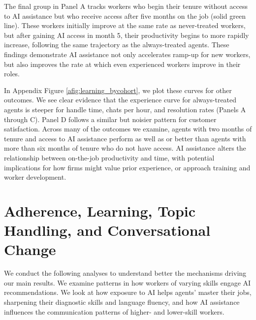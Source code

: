 \documentclass[11pt]{article}
\begin{document}
The final group in Panel A tracks workers who begin their tenure without access to AI assistance but who receive access after five months on the job (solid green line).  These workers initially improve at the same rate as never-treated workers, but after gaining AI access in month 5, their productivity begins to more rapidly increase, following the same trajectory as the always-treated agents. These findings demonstrate AI assistance not only accelerates ramp-up for new workers, but also improves the rate at which even experienced workers improve in their roles.

In Appendix Figure \ref{afig:learning_bycohort}, we plot these curves for other outcomes. We see clear evidence that the experience curve for always-treated agents is steeper for handle time, chats per hour, and resolution rates (Panels A through C). Panel D follows a similar but noisier pattern for customer satisfaction. Across many of the outcomes we examine, agents with two months of tenure and access to AI assistance perform as well as or better than agents with more than six months of tenure who do not have access. AI assistance alters the relationship between on-the-job productivity and time, with potential implications for how firms might value prior experience, or approach training and worker development.

\section{Adherence, Learning, Topic Handling, and Conversational Change}

We conduct the following analyses to understand better the mechanisms driving our main results. We examine patterns in how workers of varying skills engage AI recommendations. We look at how exposure to AI helps agents' master their jobs, sharpening their diagnostic skills and language fluency, and how AI assistance influences the communication patterns of higher- and lower-skill workers. 


\end{document}
